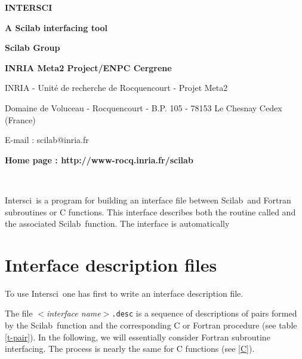 \documentclass[11pt]{article}
\begin{document}
\pagestyle{empty}


\vspace{3.cm}

{\Huge\bf  {INTERSCI}}
\vfill

{\Huge\bf  {A Scilab interfacing tool}}
\vfill

{\Huge\bf {Scilab Group}}
\vfill

{\Large\bf
INRIA Meta2 Project/ENPC Cergrene}

{\normalsize\bf
\vfill

\vspace{12.cm}

INRIA - Unit\'e de recherche de Rocquencourt - Projet Meta2

Domaine de Voluceau - Rocquencourt - B.P. 105 - 78153 Le Chesnay Cedex (France)

E-mail : scilab@inria.fr}

{\normalsize\bf Home page : http://www-rocq.inria.fr/scilab}

\newpage
\mbox{ }
\newpage


\tableofcontents
\pagestyle{headings}

\newpage

\newcommand{\ISCI}{Intersci}
\newcommand{\SCI}{Scilab}
\newcommand{\T}[1]{{\tt #1}}
\newcommand{\M}[1]{$<${\em #1}$>$}
\newcommand{\ie}{\mbox{i.e.}}

\ISCI\ is a program for building an interface file between \SCI\ and Fortran
subroutines or C functions. This interface describes both the routine
called and the associated \SCI\ function.  The interface is automatically 


\section{Interface description files}
To use \ISCI\ one has first to write an interface description file.

The file \M{interface name}\T{.desc} is a sequence of descriptions of
pairs formed by the \SCI\ function and the corresponding C or Fortran
procedure (see table \ref{t-pair}). In the following, we will
essentially consider Fortran subroutine interfacing. The process is
nearly the same for C functions (see \ref{C}).
\end{document}
